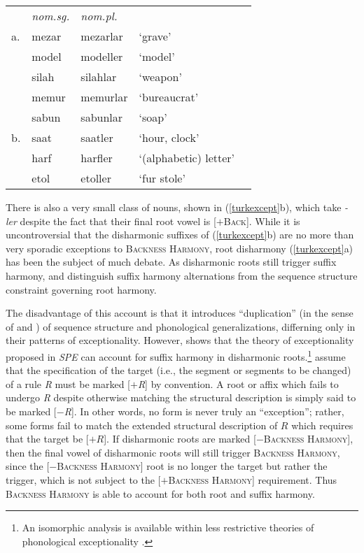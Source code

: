 \begin{example} \label{turkexcept}
\begin{tabular}{l l l l@{ }l}
   & \emph{nom.sg.} & \emph{nom.pl.} \\
a. & {mezar}        & {mezarlar} & `grave' & \citep{TELL} \\
   & {model}        & {modeller} & `model' \\
   & {silah}        & {silahlar} & `weapon'     \\
   & {memur}        & {memurlar} & `bureaucrat' \\
   & {sabun}        & {sabunlar} & `soap'       \\
b. & {saat}         & {saatler}  & `hour, clock' & \citep{Goksel2005} \\
   & {harf}         & {harfler}  & `(alphabetic) letter' \\ 
   & {etol}         & {etoller}  & `fur stole' \\
\end{tabular}
\end{example}

\noindent
There is also a very small class of nouns, shown in (\ref{turkexcept}b), which take \emph{-ler} despite the fact that their final root vowel is [$+$\textsc{Back}]. While it is uncontroversial that the disharmonic suffixes of (\ref{turkexcept}b) are no more than very sporadic exceptions to \textsc{Backness Harmony}, root disharmony (\ref{turkexcept}a) has been the subject of much debate. As disharmonic roots still trigger suffix harmony, \citet[212, 289]{Anderson1974} and \citet{Iverson1978} distinguish suffix harmony alternations from the sequence structure constraint governing root harmony.

The disadvantage of this account is that it introduces ``duplication'' (in the sense of \citealt{Kisseberth1970b} and \citealt{Kenstowicz1977}) of sequence structure and phonological generalizations, differning only in their patterns of exceptionality. However, \citet[][197f.]{Zonneveld1978} shows that the theory of exceptionality proposed in \emph{SPE} can account for suffix harmony in disharmonic roots.\footnote{An isomorphic analysis is available within less restrictive theories of phonological exceptionality \citep[e.g.,][]{Kisseberth1970,Pater2009}.} \citeauthor{SPE} assume that the specification of the target (i.e., the segment or segments to be changed) of a rule \emph{R} must be marked [$+$\emph{R}] by convention. A root or affix which fails to undergo \emph{R} despite otherwise matching the structural description is simply said to be marked [$-$\emph{R}]. In other words, no form is never truly an ``exception''; rather, some forms fail to match the extended structural description of $R$ which requires that the target be [$+R$]. If disharmonic roots are marked [$-$\textsc{Backness Harmony}], then the final vowel of disharmonic roots will still trigger \textsc{Backness Harmony}, since the [$-$\textsc{Backness Harmony}] root is no longer the target but rather the trigger, which is not subject to the [$+$\textsc{Backness Harmony}] requirement. Thus \textsc{Backness Harmony} is able to account for both root and suffix harmony.

